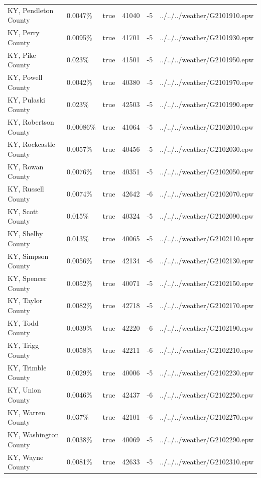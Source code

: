 \begin{longtable}[]{@{}llllll@{}}
KY, Pendleton County & 0.0047\% & true & 41040 & -5 &
../../../weather/G2101910.epw \\
KY, Perry County & 0.0095\% & true & 41701 & -5 &
../../../weather/G2101930.epw \\
KY, Pike County & 0.023\% & true & 41501 & -5 &
../../../weather/G2101950.epw \\
KY, Powell County & 0.0042\% & true & 40380 & -5 &
../../../weather/G2101970.epw \\
KY, Pulaski County & 0.023\% & true & 42503 & -5 &
../../../weather/G2101990.epw \\
KY, Robertson County & 0.00086\% & true & 41064 & -5 &
../../../weather/G2102010.epw \\
KY, Rockcastle County & 0.0057\% & true & 40456 & -5 &
../../../weather/G2102030.epw \\
KY, Rowan County & 0.0076\% & true & 40351 & -5 &
../../../weather/G2102050.epw \\
KY, Russell County & 0.0074\% & true & 42642 & -6 &
../../../weather/G2102070.epw \\
KY, Scott County & 0.015\% & true & 40324 & -5 &
../../../weather/G2102090.epw \\
KY, Shelby County & 0.013\% & true & 40065 & -5 &
../../../weather/G2102110.epw \\
KY, Simpson County & 0.0056\% & true & 42134 & -6 &
../../../weather/G2102130.epw \\
KY, Spencer County & 0.0052\% & true & 40071 & -5 &
../../../weather/G2102150.epw \\
KY, Taylor County & 0.0082\% & true & 42718 & -5 &
../../../weather/G2102170.epw \\
KY, Todd County & 0.0039\% & true & 42220 & -6 &
../../../weather/G2102190.epw \\
KY, Trigg County & 0.0058\% & true & 42211 & -6 &
../../../weather/G2102210.epw \\
KY, Trimble County & 0.0029\% & true & 40006 & -5 &
../../../weather/G2102230.epw \\
KY, Union County & 0.0046\% & true & 42437 & -6 &
../../../weather/G2102250.epw \\
KY, Warren County & 0.037\% & true & 42101 & -6 &
../../../weather/G2102270.epw \\
KY, Washington County & 0.0038\% & true & 40069 & -5 &
../../../weather/G2102290.epw \\
KY, Wayne County & 0.0081\% & true & 42633 & -5 &
../../../weather/G2102310.epw \\

\end{longtable}
